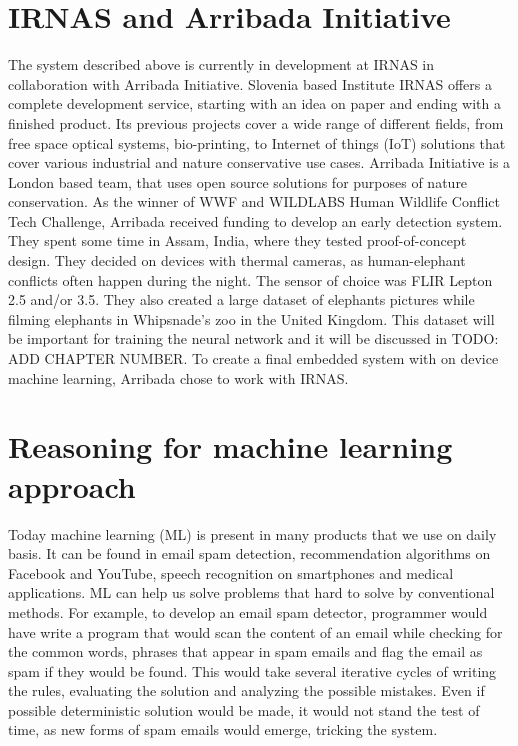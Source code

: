 \section{ IRNAS and Arribada Initiative}

The system described above is currently in development at IRNAS in collaboration with Arribada Initiative.
Slovenia based Institute IRNAS offers a complete development service, starting with an idea on paper and ending with a finished product. 
Its previous projects cover a wide range of different fields, from free space optical systems, bio-printing, to Internet of things (IoT) solutions that cover various industrial and nature conservative use cases.
Arribada Initiative is a London based team, that uses open source solutions for purposes of nature conservation.
As the winner of WWF and WILDLABS Human Wildlife Conflict Tech Challenge\cite{wildlabs-winners}, Arribada received funding to develop an early detection system.
They spent some time in Assam, India, where they tested proof-of-concept design\cite{arribada-assam}.
They decided on devices with thermal cameras, as human-elephant conflicts often happen during the night.
The sensor of choice was FLIR Lepton 2.5 and/or 3.5.
They also created a large dataset of elephants pictures while filming elephants in Whipsnade's zoo in the United Kingdom. 
This dataset will be important for training the neural network and it will be discussed in TODO: ADD CHAPTER NUMBER.
To create a final embedded system with on device machine learning, Arribada chose to work with IRNAS.


\section{ Reasoning for machine learning approach}

Today machine learning (ML) is present in many products that we use on daily basis.
It can be found in email spam detection, recommendation algorithms on Facebook and YouTube, speech recognition on smartphones and medical applications.
ML can help us solve problems that hard to solve by conventional methods.
For example, to develop an email spam detector, programmer would have write a program that would scan the content of an email while checking for the common words, phrases that appear in spam emails and flag the email as spam if they would be found.
This would take several iterative cycles of writing the rules, evaluating the solution and analyzing the possible mistakes. 
Even if possible deterministic solution would be made, it would not stand the test of time, as new forms of spam emails would emerge, tricking the system.

